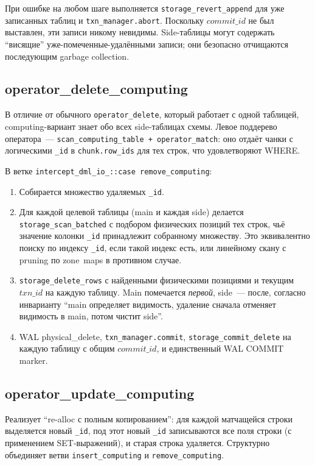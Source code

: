 При ошибке на любом шаге выполняется
\texttt{storage\_revert\_append} для уже записанных таблиц и
\texttt{txn\_manager.abort}. Поскольку $\mathit{commit\_id}$ не
был выставлен, эти записи никому невидимы. Side-таблицы могут
содержать ``висящие'' уже-помеченные-удалёнными записи; они
безопасно отчищаются последующим garbage collection.

\subsection{operator\_delete\_computing}

В отличие от обычного \texttt{operator\_delete}, который работает
с одной таблицей, computing-вариант знает обо всех side-таблицах
схемы. Левое поддерево оператора~---
\texttt{scan\_computing\_table~+~operator\_match}: оно отдаёт
чанки с логическими \texttt{\_id} в \texttt{chunk.row\_ids} для
тех строк, что удовлетворяют WHERE.

В ветке \texttt{intercept\_dml\_io\_::case remove\_computing}:

\begin{enumerate}
    \item Собирается множество удаляемых \texttt{\_id}.
    \item Для каждой целевой таблицы (main и каждая side) делается
    \texttt{storage\_scan\_batched} с подбором физических позиций
    тех строк, чьё значение колонки \texttt{\_id} принадлежит
    собранному множеству. Это эквивалентно поиску по индексу
    \texttt{\_id}, если такой индекс есть, или линейному скану с
    pruning по zone~maps в противном случае.
    \item \texttt{storage\_delete\_rows} с найденными физическими
    позициями и текущим $\mathit{txn\_id}$ на каждую таблицу. Main
    помечается \emph{первой}, side~--- после, согласно инварианту
    ``main определяет видимость, удаление сначала отменяет видимость
    в main, потом чистит side''.
    \item WAL physical\_delete, \texttt{txn\_manager.commit},
    \texttt{storage\_commit\_delete} на каждую таблицу с общим
    $\mathit{commit\_id}$, и единственный WAL COMMIT marker.
\end{enumerate}

\subsection{operator\_update\_computing}

Реализует ``re-alloc с полным копированием'': для каждой
матчащейся строки выделяется новый \texttt{\_id}, под этот новый
\texttt{\_id} записываются все поля строки (с применением
SET-выражений), и старая строка удаляется. Структурно объединяет
ветви \texttt{insert\_computing} и \texttt{remove\_computing}.

